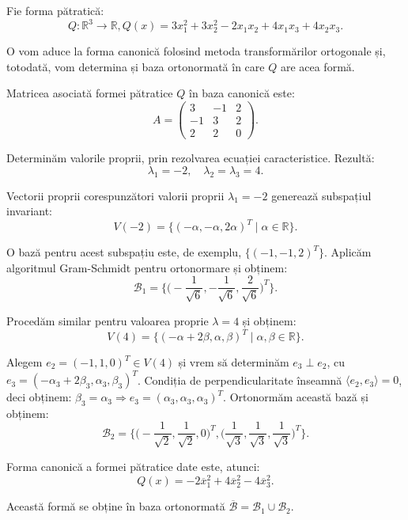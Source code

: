 \begin{example}
	Fie forma pătratică: 
 \[
	Q : \mathbb{R}^3 \to \mathbb{R}, 
	Q(x) = 3x_1^2 + 3x_2^2 - 2x_1 x_2 + 4x_1 x_3 + 4x_2 x_3.
\]

O vom aduce la forma canonică folosind metoda transformărilor ortogonale și,
totodată, vom determina și baza ortonormată în care $Q$ are acea formă.

Matricea asociată formei pătratice $Q$ în baza canonică este: 
 \[
	A = \begin{pmatrix}
	        3 & -1 & 2 \\
	        -1 & 3 & 2 \\
	        2 & 2 & 0
        \end{pmatrix}.
\]

Determinăm valorile proprii, prin rezolvarea ecuației caracteristice. Rezultă: 
 \[
	\lambda_1 = -2, \quad \lambda_2 = \lambda_3 = 4.
\]

Vectorii proprii corespunzători valorii proprii $\lambda_1 = -2$ generează
subspațiul invariant: 
 \[
	V(-2) = \{(-\alpha, -\alpha, 2 \alpha)^T \mid \alpha \in \mathbb{R} \}.
\]

O bază pentru acest subspațiu este, de exemplu, $\{(-1, -1, 2)^T\}$. Aplicăm
algoritmul Gram-Schmidt pentru ortonormare și obținem: 
 \[
	\mathcal{B}_1 = \Big\{ \Big( -\dfrac{1}{\sqrt{6}}, - \dfrac{1}{\sqrt{6}},
	\dfrac{2}{\sqrt{6}} \Big)^T \Big\}.
\]

Procedăm similar pentru valoarea proprie $\lambda = 4$ și obținem: 
 \[
	V(4) = \{(-\alpha + 2 \beta, \alpha, \beta)^T \mid \alpha, \beta 
	\in \mathbb{R} \}.
\]

Alegem $e_2 = (-1, 1, 0)^T \in V(4)$ și vrem să determinăm $e_3 \perp e_2$, cu
$e_3 = (- \alpha_3 + 2 \beta_3, \alpha_3, \beta_3)^T$. Condiția de 
perpendicularitate înseamnă $\langle e_2, e_3 \rangle = 0$, deci obținem:
$\beta_3 = \alpha_3 \Longrightarrow e_3 = (\alpha_3, \alpha_3, \alpha_3)^T$.
Ortonormăm această bază și obținem: 
 \[
	\mathcal{B}_2 = \Big\{ \Big( -\dfrac{1}{\sqrt{2}}, \dfrac{1}{\sqrt{2}}, 0
	 \Big)^T, \Big( \dfrac{1}{\sqrt{3}}, \dfrac{1}{\sqrt{3}}, 
	 \dfrac{1}{\sqrt{3}} \Big)^T \Big\}.
\]

Forma canonică a formei pătratice date este, atunci: 
 \[
	Q(x) = -2 \overline{x}_1^2 + 4\overline{x}_2^2 - 4 \overline{x}_3^2.
\]

Această formă se obține în baza ortonormată 
$\overline{\mathcal{B}} = \mathcal{B}_1 \cup \mathcal{B}_2$.
\end{example}

